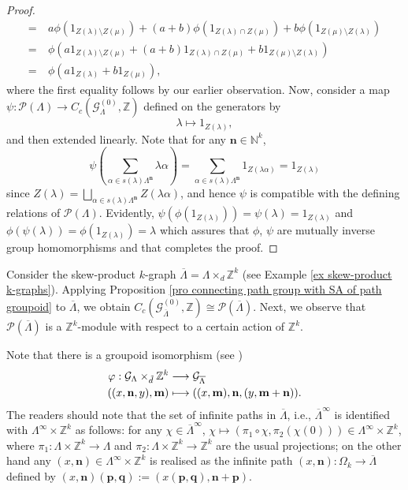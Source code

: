 \documentclass[12pt]{amsart}
\newcommand{\N}{\mathbf{n}}
\newcommand{\M}{\mathbf{m}}
\theoremstyle{definition}
\theoremstyle{remark}
\begin{document}
\begin{proof}
\begin{align*}
= &~ a\phi(1_{Z(\lambda)\setminus Z(\mu)})+(a+b)\phi(1_{Z(\lambda)\cap Z(\mu)})+b\phi(1_{Z(\mu)\setminus Z(\lambda)})\\
= &~ \phi\left(a 1_{Z(\lambda)\setminus Z(\mu)}+(a+b) 1_{Z(\lambda)\cap Z(\mu)}+b 1_{Z(\mu)\setminus Z(\lambda)}\right)\\
= &~ \phi(a 1_{Z(\lambda)}+b 1_{Z(\mu)}),   
\end{align*}
where the first equality follows by our earlier observation. Now, consider a map $\psi:\mathcal{P}(\Lambda)\longrightarrow C_c(\mathcal{G}_\Lambda^{(0)},\mathbb{Z})$ defined on the generators by \[\lambda\longmapsto 1_{Z(\lambda)},\] and then extended linearly. Note that for any $\N\in \mathbb{N}^k$, \[\psi\left(\displaystyle{\sum_{\alpha\in s(\lambda)\Lambda^\N}} \lambda\alpha\right)=\displaystyle{\sum_{\alpha\in s(\lambda)\Lambda^\N}}1_{Z(\lambda\alpha)}=1_{Z(\lambda)}\] since $Z(\lambda)=\displaystyle{\bigsqcup_{\alpha\in s(\lambda)\Lambda^\N}} Z(\lambda\alpha)$, and hence $\psi$ is compatible with the defining relations of $\mathcal{P}(\Lambda)$. Evidently, $\psi(\phi(1_{Z(\lambda)}))=\psi(\lambda)=1_{Z(\lambda)}$ and $\phi(\psi(\lambda))=\phi(1_{Z(\lambda)})=\lambda$ which assures that $\phi$, $\psi$ are mutually inverse group homomorphisms and that completes the proof.
\end{proof}
Consider the skew-product $k$-graph $\overline{\Lambda}=\Lambda\times_d \mathbb{Z}^k$ (see Example \ref{ex skew-product k-graphs}). Applying Proposition \ref{pro connecting path group with SA of path groupoid} to $\overline{\Lambda}$, we obtain $C_c(\mathcal{G}_{\overline{\Lambda}}^{(0)},\mathbb{Z})\cong \mathcal{P}(\overline{\Lambda})$. Next, we observe that $\mathcal{P}(\overline{\Lambda})$ is a $\mathbb{Z}^k$-module with respect to a certain action of $\mathbb{Z}^k$. 

Note that there is a groupoid isomorphism (see \cite[Theorem 5.2]{Kumjian--Pask})
\begin{align*}
\varphi: \mathcal{G}_\Lambda \times_{\Tilde{d}} \mathbb{Z}^k &\longrightarrow \mathcal{G}_{\overline{\Lambda}}\\
((x,\N,y),\M) &\longmapsto ((x,\M),\N,(y,\M+\N)).
\end{align*}
The readers should note that the set of infinite paths in $\overline{\Lambda}$, i.e., $\overline{\Lambda}^\infty$ is identified with $\Lambda^\infty \times \mathbb{Z}^k$ as follows: for any $\chi\in \overline{\Lambda}^\infty$, $\chi\longmapsto (\pi_1\circ \chi, \pi_2(\chi(0)))\in \Lambda^\infty \times \mathbb{Z}^k$, where $\pi_1:\Lambda\times \mathbb{Z}^k\longrightarrow \Lambda$ and $\pi_2:\Lambda\times \mathbb{Z}^k \longrightarrow \mathbb{Z}^k$ are the usual projections; on the other hand any $(x,\N)\in \Lambda^\infty \times \mathbb{Z}^k$ is realised as the infinite path $(x,\N):\Omega_k\longrightarrow \overline{\Lambda}$ defined by $(x,\N)(\mathbf{p},\mathbf{q}):=(x(\mathbf{p},\mathbf{q}),\N+\mathbf{p})$. 
\end{document}
